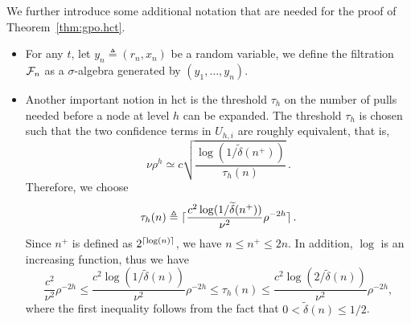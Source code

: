 We further introduce some additional notation that are needed for the proof of Theorem~\ref{thm:gpo.hct}.
\begin{itemize}
    \item For any $t$, let $y_n\triangleq(r_n,x_n)$ be a random variable, we define the filtration $\mathcal{F}_n$ as a $\sigma$-algebra generated by $(y_1,\ldots,y_n)$.
    \item Another important notion in \gls{hct} is the threshold $\tau_h$ on the number of pulls needed before a node at level $h$ can be expanded. The threshold $\tau_h$ is chosen such that the two confidence terms in $U_{h,i}$ are roughly equivalent, that is,
    \[
        \nu\rho^h \simeq c\sqrt{\frac{\log(1/\tilde{\delta}(n^+))}{\tau_h(n)}}\,.
    \]
    Therefore, we choose
    \[
        \tau_h(n) \triangleq \lceil\frac{c^2\log(1/\widetilde{\delta}(n^+))}{\nu^2}\rho^{-2h}\rceil\,.
    \]
    Since $n^+$ is defined as $2^{\lceil\log(n)\rceil}$, we have $n \leq n^+ \leq 2n$. In addition, $\log$ is an increasing function, thus we have
    \begin{equation}\label{eq:gpo.pre}
        \frac{c^2}{\nu^2}\rho^{-2h} \leq \frac{c^2 \log(1/\tilde{\delta}(n))}{\nu^2}\rho^{-2h} \leq \tau_h(n) \leq \frac{c^2\log(2/\tilde{\delta}(n))}{\nu^2}\rho^{-2h},
    \end{equation}
    where the first inequality follows from the fact that $0<\tilde{\delta}(n)\leq1/2$. 
\end{itemize}
